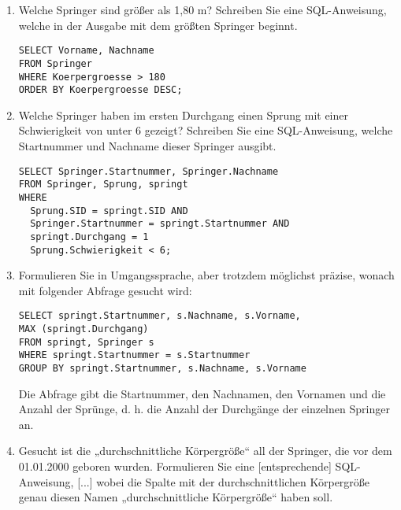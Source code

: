 \documentclass{lehramt-informatik-aufgabe}
\begin{document}
\begin{enumerate}


\item Welche Springer sind größer als 1,80 m? Schreiben Sie eine
SQL-Anweisung, welche in der Ausgabe mit dem größten Springer beginnt.

\begin{antwort}
\begin{verbatim}
SELECT Vorname, Nachname
FROM Springer
WHERE Koerpergroesse > 180
ORDER BY Koerpergroesse DESC;
\end{verbatim}
\end{antwort}


\item Welche Springer haben im ersten Durchgang einen Sprung mit einer
Schwierigkeit von unter 6 gezeigt? Schreiben Sie eine SQL-Anweisung,
welche Startnummer und Nachname dieser Springer ausgibt.

\begin{antwort}
\begin{verbatim}
SELECT Springer.Startnummer, Springer.Nachname
FROM Springer, Sprung, springt
WHERE
  Sprung.SID = springt.SID AND
  Springer.Startnummer = springt.Startnummer AND
  springt.Durchgang = 1
  Sprung.Schwierigkeit < 6;
\end{verbatim}
\end{antwort}


\item Formulieren Sie in Umgangssprache, aber trotzdem möglichst
präzise, wonach mit folgender Abfrage gesucht wird:

\begin{verbatim}
SELECT springt.Startnummer, s.Nachname, s.Vorname,
MAX (springt.Durchgang)
FROM springt, Springer s
WHERE springt.Startnummer = s.Startnummer
GROUP BY springt.Startnummer, s.Nachname, s.Vorname
\end{verbatim}

\begin{antwort}
Die Abfrage gibt die Startnummer, den Nachnamen, den Vornamen und
die Anzahl der Sprünge, d. h. die Anzahl der Durchgänge der
einzelnen Springer an.
\end{antwort}

\item Gesucht ist die „durchschnittliche Körpergröße“ all der Springer,
die vor dem 01.01.2000 geboren wurden. Formulieren Sie eine
[entsprechende] SQL-Anweisung, [...] wobei die Spalte mit der
durchschnittlichen Körpergröße genau diesen Namen „durchschnittliche
Körpergröße“ haben soll.


\end{enumerate}
\end{document}
